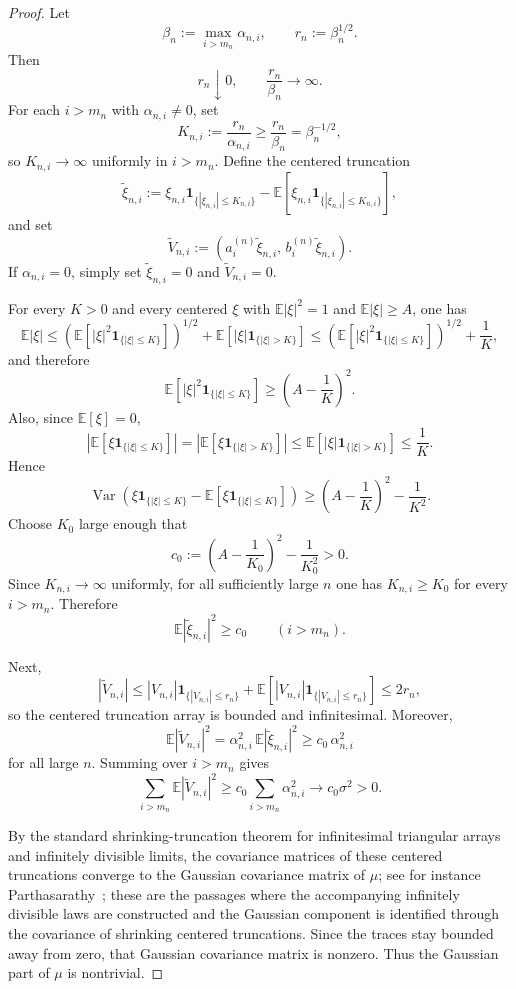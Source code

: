 \documentclass[11pt]{amsart}
\newcommand{\E}{\mathbb{E}}
\begin{document}
\begin{proof}
Let
\[
  \beta_n:=\max_{i>m_n}\alpha_{n,i},
  \qquad
  r_n:=\beta_n^{1/2}.
\]
Then
\[
  r_n\downarrow 0,
  \qquad
  \frac{r_n}{\beta_n}\longrightarrow \infty.
\]
For each $i>m_n$ with $\alpha_{n,i}\ne 0$, set
\[
  K_{n,i}:=\frac{r_n}{\alpha_{n,i}}\ge \frac{r_n}{\beta_n}=\beta_n^{-1/2},
\]
so $K_{n,i}\to\infty$ uniformly in $i>m_n$.  Define the centered truncation
\[
  \widetilde\xi_{n,i}
  :=
  \xi_{n,i}\mathbf 1_{\{|\xi_{n,i}|\le K_{n,i}\}}
  -
  \E\!\left[\xi_{n,i}\mathbf 1_{\{|\xi_{n,i}|\le K_{n,i}\}}\right],
\]
and set
\[
  \widetilde V_{n,i}:=(a_i^{(n)}\widetilde\xi_{n,i},\,b_i^{(n)}\widetilde\xi_{n,i}).
\]
If $\alpha_{n,i}=0$, simply set $\widetilde\xi_{n,i}=0$ and
$\widetilde V_{n,i}=0$.

For every $K>0$ and every centered $\xi$ with $\E|\xi|^2=1$ and
$\E|\xi|\ge A$, one has
\[
  \E|\xi|
  \le
  \left(\E\!\left[|\xi|^2\mathbf 1_{\{|\xi|\le K\}}\right]\right)^{1/2}
  +
  \E\!\left[|\xi|\mathbf 1_{\{|\xi|>K\}}\right]
  \le
  \left(\E\!\left[|\xi|^2\mathbf 1_{\{|\xi|\le K\}}\right]\right)^{1/2}
  +
  \frac1K,
\]
and therefore
\[
  \E\!\left[|\xi|^2\mathbf 1_{\{|\xi|\le K\}}\right]
  \ge
  \left(A-\frac1K\right)^2.
\]
Also, since $\E[\xi]=0$,
\[
  \left|
    \E\!\left[\xi\mathbf 1_{\{|\xi|\le K\}}\right]
  \right|
  =
  \left|
    \E\!\left[\xi\mathbf 1_{\{|\xi|>K\}}\right]
  \right|
  \le
  \E\!\left[|\xi|\mathbf 1_{\{|\xi|>K\}}\right]
  \le
  \frac1K.
\]
Hence
\[
  \operatorname{Var}\!\left(
    \xi\mathbf 1_{\{|\xi|\le K\}}
    -
    \E\!\left[\xi\mathbf 1_{\{|\xi|\le K\}}\right]
  \right)
  \ge
  \left(A-\frac1K\right)^2-\frac1{K^2}.
\]
Choose $K_0$ large enough that
\[
  c_0:=\left(A-\frac1{K_0}\right)^2-\frac1{K_0^2}>0.
\]
Since $K_{n,i}\to\infty$ uniformly, for all sufficiently large $n$ one has
$K_{n,i}\ge K_0$ for every $i>m_n$.  Therefore
\[
  \E|\widetilde\xi_{n,i}|^2\ge c_0
  \qquad (i>m_n).
\]

Next,
\[
  |\widetilde V_{n,i}|
  \le
  |V_{n,i}|\mathbf 1_{\{|V_{n,i}|\le r_n\}}
  +
  \E\!\left[|V_{n,i}|\mathbf 1_{\{|V_{n,i}|\le r_n\}}\right]
  \le
  2r_n,
\]
so the centered truncation array is bounded and infinitesimal.  Moreover,
\[
  \E|\widetilde V_{n,i}|^2
  =
  \alpha_{n,i}^2\,\E|\widetilde\xi_{n,i}|^2
  \ge
  c_0\,\alpha_{n,i}^2
\]
for all large $n$.  Summing over $i>m_n$ gives
\[
  \sum_{i>m_n}\E|\widetilde V_{n,i}|^2
  \ge
  c_0\sum_{i>m_n}\alpha_{n,i}^2
  \longrightarrow
  c_0\sigma^2>0.
\]

By the standard shrinking-truncation theorem for infinitesimal triangular
arrays and infinitely divisible limits, the covariance matrices of these
centered truncations converge to the Gaussian covariance matrix of $\mu$; see
for instance Parthasarathy~\cite[Chapter~IV, \S5, pp.~82--96; \S6,
pp.~97--101; \S7, pp.~102--108]{parthasarathy}; these are the passages
where the accompanying infinitely divisible laws are constructed and the
Gaussian component is identified through the covariance of shrinking centered
truncations.  Since the traces stay bounded away from zero, that Gaussian
covariance matrix is nonzero.  Thus the Gaussian part of $\mu$ is nontrivial.
\end{proof}
\end{document}
